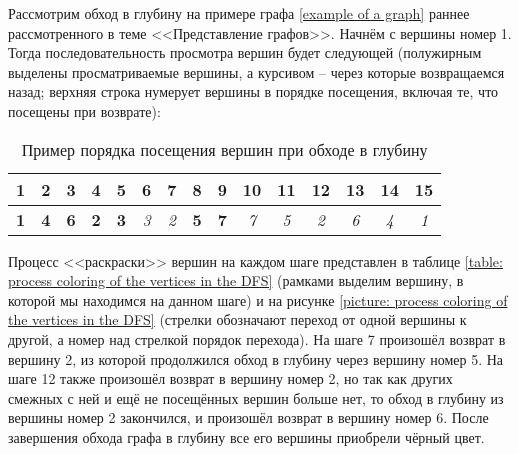 Рассмотрим обход в глубину на примере графа \ref{example of a graph} раннее 
рассмотренного в теме <<Представление графов>>. Начнём с вершины номер 1. Тогда 
последовательность просмотра вершин будет следующей (полужирным выделены 
просматриваемые вершины, а курсивом – через которые возвращаемся назад; верхняя 
строка нумерует вершины в порядке посещения, включая те, что посещены при 
возврате):

\begin{table}[h]
	\center
	\begin{tabular}{|c|c|c|c|c|c|c|c|c|c|c|c|c|c|c|}
		\hline
		1 & 2 & 3 & 4 & 5 & 6 & 7 & 8 & 9 & 10 & 11 & 12 & 13 & 14 & 15\\
		\hline
		\bfseries 1 & \bfseries 4 & \bfseries 6 & \bfseries 2 & \bfseries 3 & 
		\itshape 3 & \itshape 2 & \bfseries 5 & \bfseries 7 & \itshape 7 & 
		\itshape 5 & \itshape 2 & \itshape 6 & \itshape 4 & \itshape 1\\
		\hline
	\end{tabular}
	\caption{Пример порядка посещения вершин при обходе в глубину}
\end{table}

Процесс <<раскраски>> вершин на каждом шаге представлен в таблице \ref{table: 
process coloring of the vertices in the DFS} (рамками выделим вершину, в 
которой мы находимся на данном шаге) и на рисунке \ref{picture: process 
coloring of the vertices in the DFS} (стрелки обозначают переход от одной 
вершины к другой, а номер над стрелкой порядок перехода). На шаге 7 произошёл 
возврат в вершину 2, из которой продолжился обход в глубину через вершину номер 
5. На шаге 12 также произошёл возврат в вершину номер 2, но так как других 
смежных с ней и ещё не посещённых вершин больше нет, то обход в глубину из 
вершины номер 2 закончился, и произошёл возврат в вершину номер 6. После 
завершения обхода графа в глубину все его вершины приобрели чёрный цвет.

